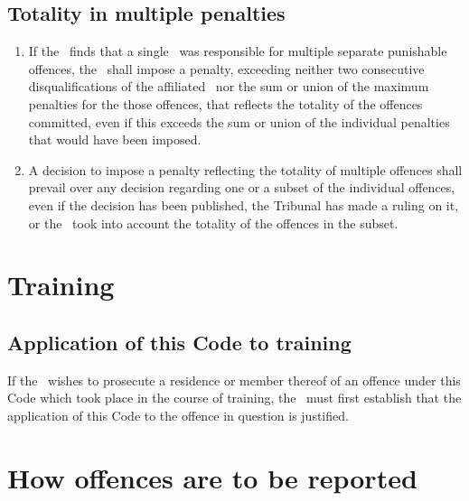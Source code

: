 \documentclass[12pt]{report}
\begin{document}
  \section{Totality in multiple penalties}
  \begin{enumerate}
    \item If the \Referee\
       finds that a single \residence\ was responsible for multiple separate punishable offences, the \Referee\ shall impose a penalty,  exceeding neither  two consecutive disqualifications of the affiliated \residence\ nor the sum or union of the maximum penalties for the those offences, that reflects the totality of the offences committed, even if this exceeds the sum or union of the individual penalties that would have been imposed.

    \item A decision to impose a penalty reflecting the totality of multiple offences shall prevail over any decision regarding one or a subset of the individual offences, even if the decision has been published, the Tribunal has made a ruling on it, or the \Referee\ took into account the totality of the offences in the subset.
  \end{enumerate}
  \chapter{Training}
  \section{Application of this Code to training}
  \begin{fenumerate}
    \item If the \Referee\ wishes to prosecute a residence or member thereof of an offence under this Code which took place in the course of training, the \Referee\ must first establish that the application of this Code to the offence in question is justified.
  \end{fenumerate}
  \chapter{How offences are to be reported}
\end{document}
